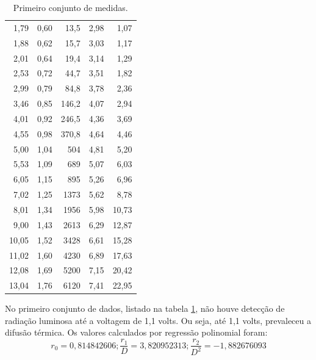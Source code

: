 \documentclass[brazilian,12pt,a4paper,twocolumn,final]{article}
\begin{document}
\begin{table}[H]
\begin{tabular}{|r|r|r|r|r|}
1,79    &       0,60    &       13,5    &       2,98    &       1,07    \\
1,88    &       0,62    &       15,7    &       3,03    &       1,17    \\
2,01    &       0,64    &       19,4    &       3,14    &       1,29    \\
2,53    &       0,72    &       44,7    &       3,51    &       1,82    \\
2,99    &       0,79    &       84,8    &       3,78    &       2,36    \\
3,46    &       0,85    &       146,2   &       4,07    &       2,94    \\
4,01    &       0,92    &       246,5   &       4,36    &       3,69    \\
4,55    &       0,98    &       370,8   &       4,64    &       4,46    \\
5,00    &       1,04    &       504     &       4,81    &       5,20    \\
5,53    &       1,09    &       689     &       5,07    &       6,03    \\
6,05    &       1,15    &       895     &       5,26    &       6,96    \\
7,02    &       1,25    &       1373    &       5,62    &       8,78    \\
8,01    &       1,34    &       1956    &       5,98    &       10,73   \\
9,00    &       1,43    &       2613    &       6,29    &       12,87   \\
10,05   &       1,52    &       3428    &       6,61    &       15,28   \\
11,02   &       1,60    &       4230    &       6,89    &       17,63   \\
12,08   &       1,69    &       5200    &       7,15    &       20,42   \\
13,04   &       1,76    &       6120    &       7,41    &       22,95   \\
 \hline
 \end{tabular}
 \caption{Primeiro conjunto de medidas.}
 \label{tabdados1}
\end{table}

No primeiro conjunto de dados, listado na tabela \ref{tabdados1}, 
não houve detecção de radiação luminosa até a voltagem de 1,1 volts.
Ou seja, até 1,1 volts, prevaleceu a difusão térmica.
Os valores calculados por regressão polinomial foram:
$$r_0=0,814842606; \frac{r_1}{D}=3,820952313; \frac{r_2}{D^2}=-1,882676093$$
\end{document}

